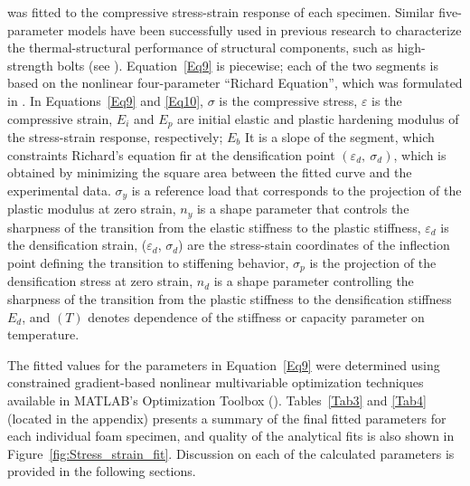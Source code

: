 \documentclass[review]{elsarticle}
\begin{document}
was fitted to the compressive stress-strain response of each specimen. Similar five-parameter models have been successfully used in previous research to characterize the thermal-structural performance of structural components, such as high-strength bolts (see \cite{Wei2018}). Equation~\ref{Eq9} is piecewise; each of the two segments is based on the nonlinear four-parameter ``Richard Equation'', which was formulated in \cite{Ric1975}. In Equations~\ref{Eq9} and \ref{Eq10}, $\sigma$ is the compressive stress, $\varepsilon$ is the compressive strain, $E_i$ and $E_p$ are initial elastic and plastic hardening modulus of the stress-strain response, respectively; $E_b$ It is a slope of the segment, which constraints Richard's equation fir at the densification point $(\varepsilon_d,~\sigma_d)$, which is obtained by minimizing the square area between the fitted curve and the experimental data. $\sigma_y$ is a reference load that corresponds to the projection of the plastic modulus at zero strain, $n_y$ is a shape parameter that controls the sharpness of the transition from the elastic stiffness to the plastic stiffness, $\varepsilon_d$ is the densification strain, ($\varepsilon_d$, $\sigma_d$) are the stress-stain coordinates of the inflection point defining the transition to stiffening behavior, $\sigma_p$ is the projection of the densification stress at zero strain, $n_d$ is a shape parameter controlling the sharpness of the transition from the plastic stiffness to the densification stiffness $E_d$, and $(T)$ denotes dependence of the stiffness or capacity parameter on temperature.

The fitted values for the parameters in Equation~\ref{Eq9} were determined using constrained gradient-based nonlinear multivariable optimization techniques available in MATLAB's Optimization Toolbox (\cite{Mat}). Tables~\ref{Tab3} and \ref{Tab4} (located in the appendix) presents a summary of the final fitted parameters for each individual foam specimen, and quality of the analytical fits is also shown in Figure~\ref{fig:Stress_strain_fit}. Discussion on each of the calculated parameters is provided in the following sections.
\end{document}

